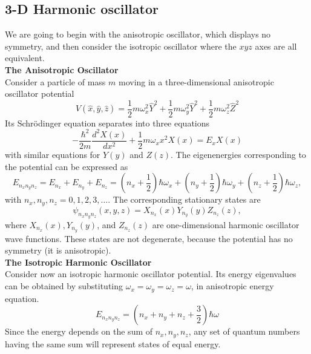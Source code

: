 \subsection{3-D Harmonic oscillator}
We are going to begin with the anisotropic oscillator, which displays no symmetry, and then consider the isotropic oscillator where the $x y z$ axes are all equivalent.\\
\textbf{ The Anisotropic Oscillator}\\
Consider a particle of mass $m$ moving in a three-dimensional anisotropic oscillator potential
$$
\hat{V}(\hat{x}, \hat{y}, \hat{z})=\frac{1}{2} m \omega_{x}^{2} \hat{Y}^{2}+\frac{1}{2} m \omega_{y}^{2} \hat{Y}^{2}+\frac{1}{2} m \omega_{z}^{2} \hat{Z}^{2}
$$
Its Schrödinger equation separates into three equations
$$
-\frac{\hbar^{2}}{2 m} \frac{d^{2} X(x)}{d x^{2}}+\frac{1}{2} m \omega_{x} x^{2} X(x)=E_{x} X(x)
$$
with similar equations for $Y(y)$ and $Z(z)$. The eigenenergies corresponding to the potential can be expressed as
$$
E_{n_{x} n_{y} n_{z}}=E_{n_{x}}+E_{n_{y}}+E_{n_{z}}=\left(n_{x}+\frac{1}{2}\right) \hbar \omega_{x}+\left(n_{y}+\frac{1}{2}\right) \hbar \omega_{y}+\left(n_{z}+\frac{1}{2}\right) \hbar \omega_{z},
$$
with $n_{x}, n_{y}, n_{z}=0,1,2,3, \ldots$. The corresponding stationary states are
$$
\psi_{n_{x} n_{y} n_{z}}(x, y, z)=X_{n_{x}}(x) Y_{n_{y}}(y) Z_{n_{z}}(z),
$$
where $X_{n_{x}}(x), Y_{n_{y}}(y)$, and $Z_{n_{z}}(z)$ are one-dimensional harmonic oscillator wave functions. These states are not degenerate, because the potential  has no symmetry (it is anisotropic).\\
\textbf{ The Isotropic Harmonic Oscillator}\\
Consider now an isotropic harmonic oscillator potential. Its energy eigenvalues can be obtained  by substituting $\omega_{x}=\omega_{y}=\omega_{z}=\omega$, in anisotropic energy equation.
$$
E_{n_{x} n_{y} n_{z}}=\left(n_{x}+n_{y}+n_{z}+\frac{3}{2}\right) \hbar \omega
$$
Since the energy depends on the sum of $n_{x}, n_{y}, n_{z}$, any set of quantum numbers having the same sum will represent states of equal energy.


